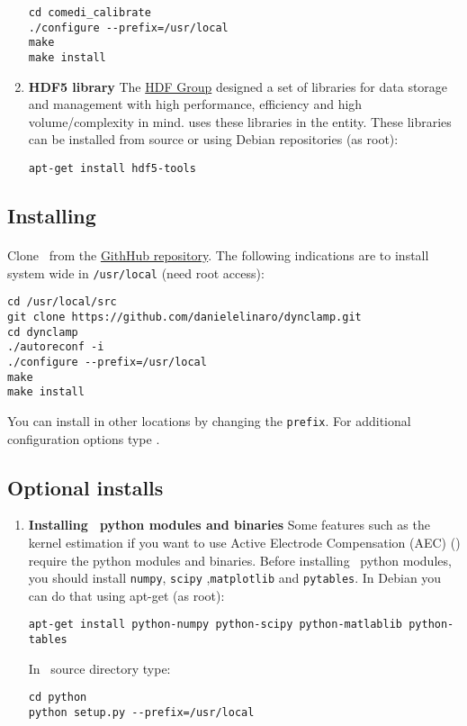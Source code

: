 \begin{enumerate}
\begin{lstlisting}
cd comedi_calibrate
./configure --prefix=/usr/local
make
make install
\end{lstlisting}

\item \textbf{HDF5 library} 
The \href{http://www.hdfgroup.org/HDF5/}{HDF Group} designed a set of libraries for data storage and management with high performance, efficiency and high volume/complexity in mind. \textbf{\progname} uses these libraries in the  entity. These libraries can be installed from source or using Debian repositories (as root):
\begin{lstlisting}
apt-get install hdf5-tools
\end{lstlisting}


\end{enumerate}

\subsection{Installing \progname} 
\label{install:program}
\paragraph{}
Clone \progname\ from the \href{https://github.com/danielelinaro/dynclamp}{GithHub repository}. The following indications are to install system wide in \texttt{/usr/local} (need root access):
\begin{lstlisting}
cd /usr/local/src
git clone https://github.com/danielelinaro/dynclamp.git
cd dynclamp
./autoreconf -i
./configure --prefix=/usr/local
make
make install
\end{lstlisting}
You can install in other locations by changing the \texttt{prefix}.
For additional configuration options type .

\subsection{Optional installs} 
\label{install:optional}
\begin{enumerate}
\item \textbf{Installing \progname\ python modules and binaries}
Some features such as the kernel estimation if you want to use Active Electrode Compensation (AEC) (\cite{Brette:2008}) require the python modules and binaries.
Before installing \progname\ python modules, you should install \texttt{numpy}, \texttt{scipy} ,\texttt{matplotlib} and \texttt{pytables}. In Debian you can do that using apt-get (as root): 
\begin{lstlisting}
apt-get install python-numpy python-scipy python-matlablib python-tables
\end{lstlisting}

In \progname\ source directory type:
\begin{lstlisting}
cd python
python setup.py --prefix=/usr/local
\end{lstlisting}


\end{enumerate}

